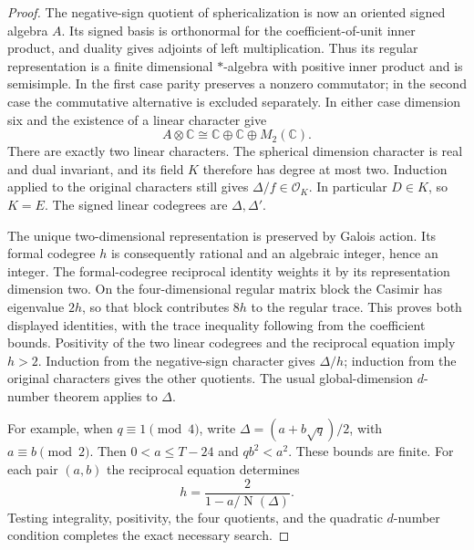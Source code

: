 \begin{proof}
The negative-sign quotient of sphericalization is now an oriented
signed algebra $A$. Its signed basis is orthonormal for the
coefficient-of-unit inner product, and duality gives adjoints of
left multiplication. Thus its regular representation is a finite
dimensional $*$-algebra with positive inner product and is
semisimple. In the first case parity preserves a nonzero commutator;
in the second case the commutative alternative is excluded separately.
In either case dimension six and the existence of a linear character give
\[
 A\otimes\mathbb C\cong\mathbb C\oplus\mathbb C\oplus M_2(\mathbb C).
\]
There are exactly two linear characters. The spherical dimension
character is real and dual invariant, and its field $K$ therefore
has degree at most two. Induction applied to the original characters
still gives $\Delta/f\in\mathcal O_K$. In particular $D\in K$,
so $K=E$. The signed linear codegrees are $\Delta,\Delta'$.

The unique two-dimensional representation is preserved by Galois
action. Its formal codegree $h$ is consequently rational and an
algebraic integer, hence an integer. The formal-codegree reciprocal
identity weights it by its representation dimension two. On the
four-dimensional regular matrix block the Casimir has eigenvalue
$2h$, so that block contributes $8h$ to the regular trace.
This proves both displayed identities, with the trace inequality
following from the coefficient bounds. Positivity of the two linear
codegrees and the reciprocal equation imply $h>2$.
Induction from the negative-sign character gives $\Delta/h$;
induction from the original characters gives the other quotients.
The usual global-dimension $d$-number theorem applies to $\Delta$.

For example, when $q\equiv1\pmod4$, write
$\Delta=(a+b\sqrt q)/2$, with $a\equiv b\pmod2$.
Then $0<a\leq T-24$ and $qb^2<a^2$. These bounds are finite.
For each pair $(a,b)$ the reciprocal equation determines
\[
 h=\frac{2}{1-a/\operatorname{N}(\Delta)}.
\]
Testing integrality, positivity, the four quotients, and the
quadratic $d$-number condition completes the exact necessary search.
\end{proof}

